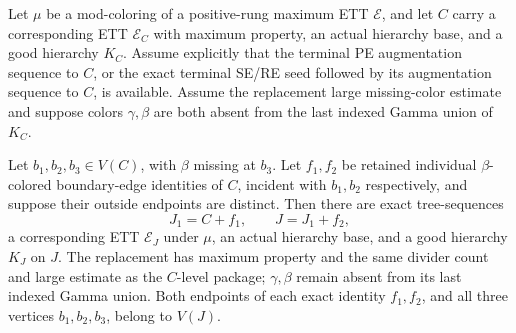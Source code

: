 \begin{lemma}
Let $\mu$ be a mod-coloring of a positive-rung maximum ETT $\mathcal E$,
and let
$C$ carry a corresponding ETT $\mathcal E_C$ with maximum property, an
actual hierarchy base, and a good hierarchy $K_C$.  Assume explicitly
that the terminal PE augmentation sequence to $C$, or the exact terminal
SE/RE seed followed by its augmentation sequence to $C$, is available.
Assume the replacement large missing-color estimate and suppose colors
$\gamma,\beta$ are both absent from the last indexed Gamma union of
$K_C$.

Let $b_1,b_2,b_3\in V(C)$, with $\beta$ missing at $b_3$.  Let $f_1,f_2$
be retained individual $\beta$-colored boundary-edge identities of $C$,
incident with $b_1,b_2$ respectively, and suppose their outside endpoints
are distinct.  Then there are exact tree-sequences
\[
                         J_1=C+f_1,\qquad J=J_1+f_2,
\]
a corresponding ETT $\mathcal E_J$ under $\mu$, an actual hierarchy
base, and a good hierarchy $K_J$ on $J$.  The replacement has maximum
property and the same divider count and large estimate as the $C$-level
package; $\gamma,\beta$ remain absent from its last indexed Gamma union.
Both endpoints of each exact identity $f_1,f_2$, and all three vertices
$b_1,b_2,b_3$, belong to $V(J)$.
\end{lemma}
